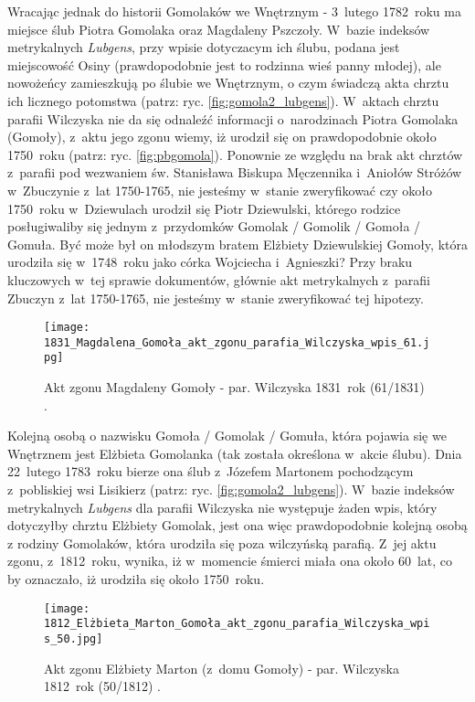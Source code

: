 Wracając jednak do historii Gomolaków we Wnętrznym - 3~lutego 1782~roku ma 
miejsce ślub Piotra Gomolaka oraz Magdaleny Pszczoły. W~bazie indeksów 
metrykalnych \emph{Lubgens}, przy wpisie dotyczacym ich ślubu, podana 
jest miejscowość Osiny (prawdopodobnie jest to rodzinna wieś panny młodej), 
ale nowożeńcy zamieszkują po ślubie we Wnętrznym, o czym świadczą akta chrztu 
ich licznego potomstwa (patrz: ryc. \ref{fig:gomola2_lubgens}). W~aktach 
chrztu parafii Wilczyska nie da się odnaleźć informacji o~narodzinach Piotra 
Gomolaka (Gomoły), z~aktu jego zgonu wiemy, iż urodził się on prawdopodobnie 
około 1750~roku (patrz: ryc. \ref{fig:pbgomola}). Ponownie ze względu na brak 
akt chrztów z~parafii pod wezwaniem św. Stanisława Biskupa Męczennika 
i~Aniołów Stróżów w~Zbuczynie z~lat 1750-1765, nie jesteśmy w~stanie 
zweryfikować czy około 1750~roku w~Dziewulach urodził się Piotr Dziewulski, 
którego rodzice posługiwaliby się jednym z~przydomków Gomolak / Gomolik / 
Gomoła / Gomuła. Być może był on młodszym bratem Elżbiety Dziewulskiej 
Gomoły, która urodziła się w~1748~roku jako córka Wojciecha i~Agnieszki? Przy 
braku kluczowych w~tej sprawie dokumentów, głównie akt metrykalnych z~parafii 
Zbuczyn z~lat 1750-1765, nie jesteśmy w~stanie zweryfikować tej hipotezy.

\begin{figure}[!ht]
    \vspace*{0.5cm}
    \centering \texttt{[image: 
        1831\_Magdalena\_Gomoła\_akt\_zgonu\_parafia\_Wilczyska\_wpis\_61.jpg]}
    \captionsetup{format=hang}
    \caption{Akt zgonu Magdaleny Gomoły - par. Wilczyska 1831~rok (61/1831) 
    \cite{par_wilczyska1}.}
    \label{fig:mgomola}
\end{figure}

Kolejną osobą o nazwisku Gomoła / Gomolak / Gomuła, która pojawia się we 
Wnętrznem jest Elżbieta Gomolanka (tak została określona w~akcie ślubu). 
Dnia 22~lutego 1783~roku bierze ona ślub z~Józefem Martonem pochodzącym 
z~pobliskiej wsi Lisikierz (patrz: ryc. \ref{fig:gomola2_lubgens}). 
W~bazie indeksów metrykalnych \emph{Lubgens} dla parafii Wilczyska nie 
występuje żaden wpis, który dotyczyłby chrztu Elżbiety Gomolak, jest ona więc 
prawdopodobnie kolejną osobą z rodziny Gomolaków, która urodziła się poza 
wilczyńską parafią. Z~jej aktu zgonu, z~1812~roku, wynika, iż w~momencie 
śmierci miała ona około 60~lat, co by oznaczało, iż urodziła się około 
1750~roku. 

\begin{figure}[!ht]
    \vspace*{0.5cm}
    \centering \texttt{[image: 
        1812\_Elżbieta\_Marton\_Gomoła\_akt\_zgonu\_parafia\_Wilczyska\_wpis\_50.jpg]}
    \captionsetup{format=hang}
    \caption{Akt zgonu Elżbiety Marton (z~domu Gomoły) - par. Wilczyska 
    1812~rok (50/1812) \cite{par_wilczyska1}.}
    \label{fig:egomola_1812}
\end{figure}

